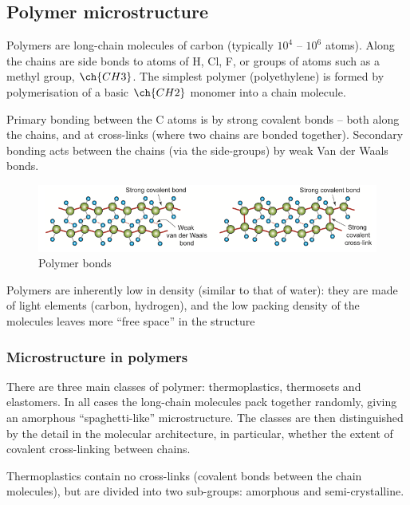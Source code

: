 \documentclass{article}
\begin{document}
\subsection{Polymer microstructure}

Polymers are long-chain molecules of carbon (typically $10^4$ – $10^6$ atoms). Along the chains are side bonds to atoms of H, Cl, F, or groups of atoms such as a methyl group, $\ch{CH3}$. The simplest polymer (polyethylene) is formed by polymerisation of a basic $\ch{CH2}$ monomer into a chain molecule.

Primary bonding between the C atoms is by strong covalent bonds – both along the chains, and at cross-links (where two chains are bonded together). Secondary bonding acts between the chains (via the side-groups) by weak Van der Waals bonds.

\begin{figure}[h]
    \centering
    \includegraphics[width = 1\textwidth]{images/mat13.png}
    \caption{Polymer bonds}
    \label{fig:enter-label}
\end{figure}

Polymers are inherently low in density (similar to that of water): they are made of light elements (carbon, hydrogen), and the low packing density of the molecules leaves more “free space” in the structure

\subsubsection{Microstructure in polymers}

There are three main classes of polymer: thermoplastics, thermosets and elastomers. In all cases the long-chain molecules pack together randomly, giving an amorphous “spaghetti-like” microstructure. The classes are then distinguished by the detail in the molecular architecture, in particular, whether the extent of covalent cross-linking between chains.

\begin{definition}[Thermoplastics]
    Thermoplastics contain no cross-links (covalent bonds between the chain molecules), but are divided into two sub-groups: amorphous and semi-crystalline.
\end{definition}
\end{document}
